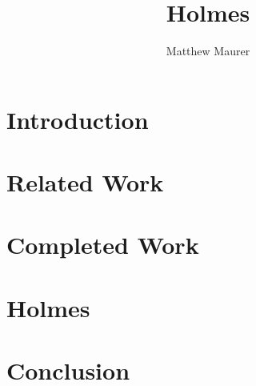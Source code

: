 \documentclass{report}
\begin{document}

\title{Holmes}
\author{Matthew Maurer}
\maketitle
\begin{abstract}

\end{abstract}
\tableofcontents
\chapter{Introduction}

\chapter{Related Work}
\chapter{Completed Work}
\chapter{Holmes}
\chapter{Conclusion}
\end{document}
